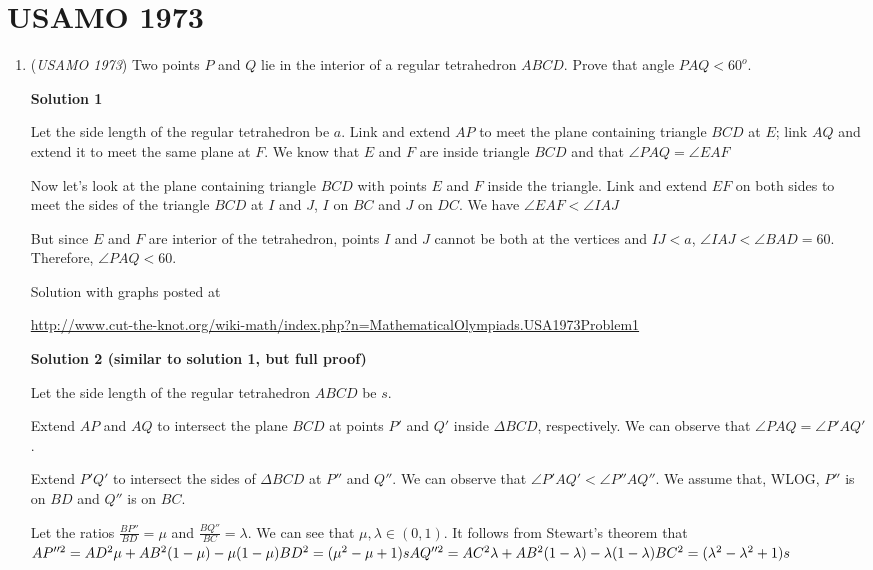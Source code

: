 \section{USAMO 1973}
        \begin{enumerate}
        	\item (\textit{USAMO 1973}) Two points $P$ and $Q$ lie in the interior of a regular tetrahedron $ABCD$. Prove that angle $PAQ<60^o$.


 



\textbf{Solution 1}

Let the side length of the regular tetrahedron be $a$. Link and extend $AP$ to meet the plane containing triangle $BCD$ at $E$; link $AQ$ and extend it to meet the same plane at $F$. We know that $E$ and $F$ are inside triangle $BCD$ and that $\angle PAQ = \angle EAF$

 Now let’s look at the plane containing triangle $BCD$ with points $E$ and $F$ inside the triangle. Link and extend $EF$ on both sides to meet the sides of the triangle $BCD$ at $I$ and $J$, $I$ on $BC$ and $J$ on $DC$. We have $\angle EAF < \angle IAJ$

 But since $E$ and $F$ are interior of the tetrahedron, points $I$ and $J$ cannot be both at the vertices and $IJ < a$, $\angle IAJ < \angle BAD = 60$. Therefore, $\angle PAQ < 60$.

 Solution with graphs posted at

 \href{https://artofproblemsolving.comhttp://www.cut-the-knot.org/wiki-math/index.php?n=MathematicalOlympiads.USA1973Problem1}{http://www.cut-the-knot.org/wiki-math/index.php?n=MathematicalOlympiads.USA1973Problem1}

 



\textbf{Solution 2 (similar to solution 1, but full proof)}

Let the side length of the regular tetrahedron $ABCD$ be $s$.

 Extend $AP$ and $AQ$ to intersect the plane $BCD$ at points $P'$ and $Q'$ inside $\Delta BCD$, respectively. We can observe that $\angle PAQ=\angle P'AQ'$.

 Extend $P'Q'$ to intersect the sides of $\Delta BCD$ at $P''$ and $Q''$. We can observe that $\angle P'AQ'<\angle P''AQ''$. We assume that, WLOG, $P''$ is on $BD$ and $Q''$ is on $BC$.

 Let the ratios $\frac{BP''}{BD}=\mu$ and $\frac{BQ''}{BC}=\lambda$. We can see that $\mu,\lambda\in (0,1)$. It follows from Stewart's theorem that$AP''^2=AD^2\mu+AB^2(1-\mu)-\mu(1-\mu)BD^2=(\mu^2-\mu+1)s\\ AQ''^2=AC^2\lambda+AB^2(1-\lambda)-\lambda(1-\lambda)BC^2=(\lambda^2-\lambda^2+1)s$


\end{enumerate}
